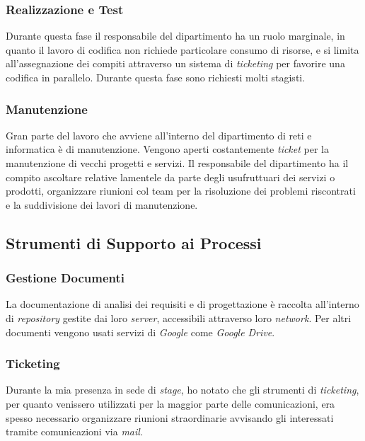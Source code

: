 \subsubsection{Realizzazione e Test}

Durante questa fase il responsabile del dipartimento ha un ruolo marginale, in quanto il lavoro di codifica non richiede particolare consumo di risorse, e si limita all'assegnazione dei compiti attraverso un sistema di \textit{ticketing} per favorire una codifica in parallelo. Durante questa fase sono richiesti molti stagisti.

\subsubsection{Manutenzione}

Gran parte del lavoro che avviene all'interno del dipartimento di reti e informatica è di manutenzione. Vengono aperti costantemente \textit{ticket} per la manutenzione di vecchi progetti e servizi. Il responsabile del dipartimento ha il compito  ascoltare relative lamentele da parte degli usufruttuari dei servizi o prodotti, organizzare riunioni col team per la risoluzione dei problemi riscontrati e la suddivisione dei lavori di manutenzione. 

\subsection{Strumenti di Supporto ai Processi}

\subsubsection{Gestione Documenti}
La documentazione di analisi dei requisiti e di progettazione è raccolta all'interno di \textit{repository} gestite dai loro \textit{server}, accessibili attraverso loro \textit{network}. Per altri documenti vengono usati servizi di \textit{Google} come \textit{Google Drive}.

\subsubsection{Ticketing}

Durante la mia presenza in sede di \textit{stage}, ho notato che gli strumenti di \textit{ticketing}, per quanto venissero utilizzati per la maggior parte delle comunicazioni, era spesso necessario organizzare riunioni straordinarie avvisando gli interessati tramite comunicazioni via \textit{mail}. 

